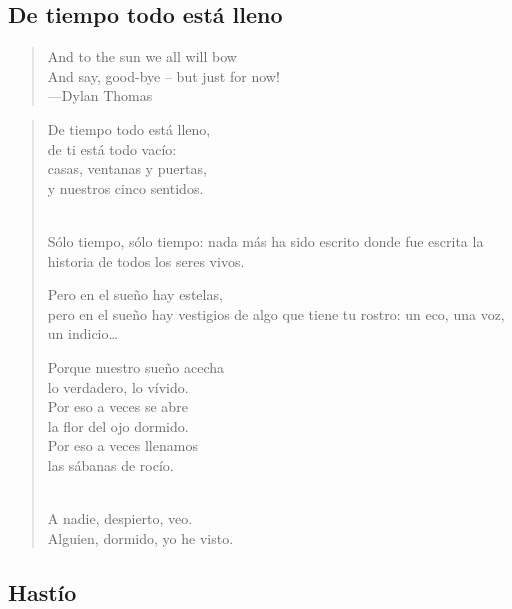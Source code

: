 \documentclass[a4paper, 12pt]{article}
\begin{document}
\pagebreak
\subsection{De tiempo todo está lleno}

\scriptsize
\begin{quote}
    \hspace*{\fill}And to the sun we all will bow\\
\hspace*{\fill}And say, good-bye – but just for now!\\
\hspace*{\fill}—Dylan Thomas
\end{quote}
\normalsize

\begin{verse}
De tiempo todo está lleno,\\
de ti está todo vacío:\\
casas, ventanas y puertas,\\
y nuestros cinco sentidos.\\
~ 

Sólo tiempo, sólo tiempo:
nada más ha sido escrito 
donde fue escrita la historia 
de todos los seres vivos.
~ 

Pero en el sueño hay estelas,\\
pero en el sueño hay vestigios 
de algo que tiene tu rostro:
un eco, una voz, un indicio\ldots
~ 

Porque nuestro sueño acecha\\
lo verdadero, lo vívido.\\
Por eso a veces se abre\\
la flor del ojo dormido.\\
Por eso a veces llenamos\\
las sábanas de rocío.\\
~ 

A nadie, despierto, veo.\\
Alguien, dormido, yo he visto.\\
\end{verse}

\pagebreak 
\subsection{Hastío}
~ 
\end{document}
